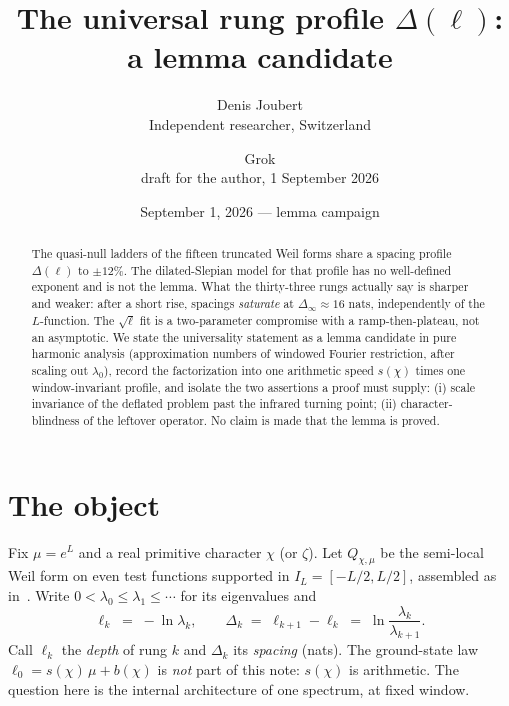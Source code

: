\documentclass[10pt]{article}
\title{\bfseries The universal rung profile $\Delta(\ell)$:\\
a lemma candidate}
\author{Denis Joubert\\ \small Independent researcher, Switzerland
\and Grok\\ \small draft for the author, 1 September 2026}
\date{September 1, 2026 --- lemma campaign}
\theoremstyle{definition}
\begin{document}
\maketitle

\begin{abstract}
\noindent
The quasi-null ladders of the fifteen truncated Weil forms share a spacing
profile $\Delta(\ell)$ to $\pm12\%$. The dilated-Slepian model for that
profile has no well-defined exponent and is not the lemma. What the
thirty-three rungs actually say is sharper and weaker: after a short
rise, spacings \emph{saturate} at $\Delta_\infty\approx16$ nats,
independently of the $L$-function. The $\sqrt{\ell}$ fit is a two-parameter
compromise with a ramp-then-plateau, not an asymptotic. We state the
universality statement as a lemma candidate in pure harmonic analysis
(approximation numbers of windowed Fourier restriction, after scaling out
$\lambda_0$), record the factorization into one arithmetic speed $s(\chi)$
times one window-invariant profile, and isolate the two assertions a
proof must supply: (i) scale invariance of the deflated problem past the
infrared turning point; (ii) character-blindness of the leftover
operator. No claim is made that the lemma is proved.
\end{abstract}

\section{The object}

Fix $\mu=e^L$ and a real primitive character $\chi$ (or $\zeta$). Let
$Q_{\chi,\mu}$ be the semi-local Weil form on even test functions
supported in $I_L=[-L/2,L/2]$, assembled as in~\cite{Quorum}. Write
$0<\lambda_0\le\lambda_1\le\cdots$ for its eigenvalues and
\[
\ell_k \;=\; -\ln\lambda_k,\qquad
\Delta_k \;=\; \ell_{k+1}-\ell_k \;=\; \ln\frac{\lambda_k}{\lambda_{k+1}}.
\]
Call $\ell_k$ the \emph{depth} of rung $k$ and $\Delta_k$ its
\emph{spacing} (nats). The ground-state law
$\ell_0=s(\chi)\,\mu+b(\chi)$ is \emph{not} part of this note: $s(\chi)$
is arithmetic. The question here is the internal architecture of one
spectrum, at fixed window.
\end{document}
